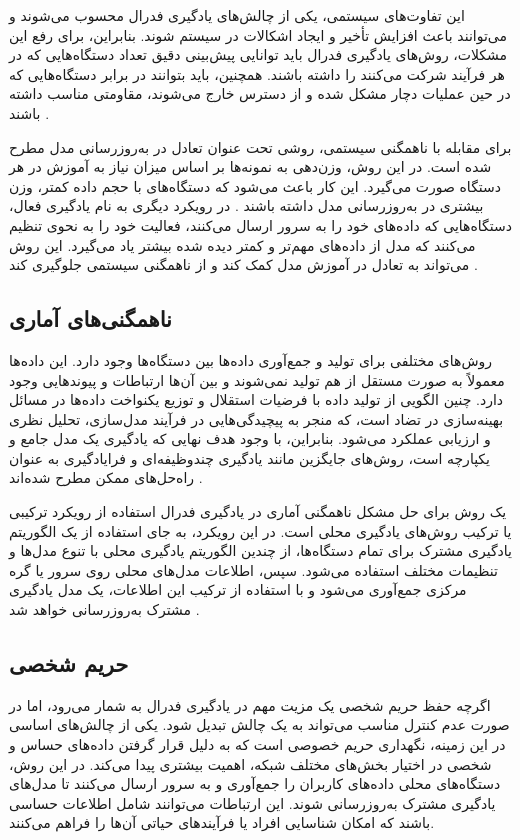 این تفاوت‌های سیستمی، یکی از چالش‌های یادگیری فدرال محسوب می‌شوند و می‌توانند باعث افزایش تأخیر و ایجاد اشکالات در سیستم شوند. بنابراین، برای رفع این مشکلات، روش‌های یادگیری فدرال باید توانایی پیش‌بینی دقیق تعداد دستگاه‌هایی که در هر فرآیند شرکت می‌کنند را داشته باشند. همچنین، باید بتوانند در برابر دستگاه‌هایی که در حین عملیات دچار مشکل شده و از دسترس خارج می‌شوند، مقاومتی مناسب داشته باشند
\cite{li2020federated}.


برای مقابله با ناهمگنی سیستمی، روشی تحت عنوان تعادل در به‌روزرسانی مدل مطرح شده است. در این روش، وزن‌دهی به نمونه‌ها بر اساس میزان نیاز به آموزش در هر دستگاه صورت می‌گیرد. این کار باعث می‌شود که دستگاه‌های با حجم داده کمتر، وزن بیشتری در به‌روزرسانی مدل داشته باشند
\cite{konevcny2015federated}.
در رویکرد دیگری به نام یادگیری فعال، دستگاه‌هایی که داده‌های خود را به سرور ارسال می‌کنند، فعالیت خود را به نحوی تنظیم می‌کنند که مدل از داده‌های مهم‌تر و کمتر دیده شده بیشتر یاد می‌گیرد. این روش می‌تواند به تعادل در آموزش مدل کمک کند و از ناهمگنی سیستمی جلوگیری کند
\cite{konevcny2016federated}.


\subsection{
	ناهمگنی‌های آماری%
}
روش‌های مختلفی برای تولید و جمع‌آوری داده‌ها بین دستگاه‌ها وجود دارد. این داده‌ها معمولاً به صورت مستقل از هم تولید نمی‌شوند و بین آن‌ها ارتباطات و پیوندهایی وجود دارد. چنین الگویی از تولید داده با فرضیات استقلال و توزیع یکنواخت داده‌ها
در مسائل بهینه‌سازی در تضاد است، که منجر به پیچیدگی‌هایی در فرآیند مدل‌سازی، تحلیل نظری و ارزیابی عملکرد می‌شود. بنابراین، با وجود هدف نهایی که یادگیری یک مدل جامع و یکپارچه است، روش‌های جایگزین مانند یادگیری چندوظیفه‌ای%
و فرایادگیری%
به عنوان راه‌حل‌های ممکن مطرح شده‌اند
\cite{li2020federated}.


یک روش برای حل مشکل ناهمگنی آماری در یادگیری فدرال استفاده از رویکرد ترکیبی یا ترکیب روش‌های یادگیری محلی است. در این رویکرد، به جای استفاده از یک الگوریتم یادگیری مشترک برای تمام دستگاه‌ها، از چندین الگوریتم یادگیری محلی با تنوع مدل‌ها و تنظیمات مختلف استفاده می‌شود. سپس، اطلاعات مدل‌های محلی روی سرور یا گره مرکزی جمع‌آوری می‌شود و با استفاده از ترکیب این اطلاعات، یک مدل یادگیری مشترک به‌روزرسانی خواهد شد
\cite{konevcny2015federated}.



\subsection{حریم شخصی}
اگرچه حفظ حریم شخصی یک مزیت مهم در یادگیری فدرال به شمار می‌رود، اما در صورت عدم کنترل مناسب می‌تواند به یک چالش تبدیل شود. یکی از چالش‌های اساسی در این زمینه، نگهداری حریم خصوصی است که به دلیل قرار گرفتن داده‌های حساس و شخصی در اختیار بخش‌های مختلف شبکه، اهمیت بیشتری پیدا می‌کند. در این روش، دستگاه‌های محلی داده‌های کاربران را جمع‌آوری و به سرور ارسال می‌کنند تا مدل‌های یادگیری مشترک به‌روزرسانی شوند. این ارتباطات می‌توانند شامل اطلاعات حساسی باشند که امکان شناسایی افراد یا فرآیندهای حیاتی آن‌ها را فراهم می‌کنند.

